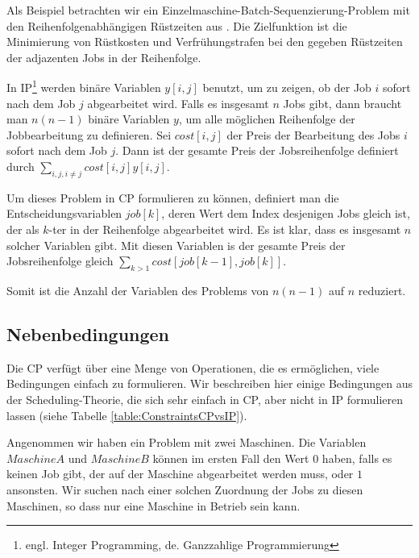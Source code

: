 Als Beispiel betrachten wir ein Einzelmaschine-Batch-Sequenzierung-Problem mit den Reihenfolgenabhängigen Rüstzeiten aus \cite{Jordan}. Die Zielfunktion ist die Minimierung von Rüstkosten und Verfrühungstrafen bei den gegeben Rüstzeiten der adjazenten Jobs in der Reihenfolge.

In IP\footnote{engl. Integer Programming, de. Ganzzahlige Programmierung} werden binäre Variablen $y[i,j]$ benutzt, um zu zeigen, ob der Job $i$ sofort nach dem Job $j$ abgearbeitet wird. Falls es insgesamt $n$ Jobs gibt, dann braucht man $n(n-1)$ binäre Variablen $y$, um alle möglichen Reihenfolge der Jobbearbeitung zu definieren. Sei $cost[i,j]$ der Preis der Bearbeitung des Jobs $i$ sofort nach dem Job $j$. Dann ist der gesamte Preis der Jobsreihenfolge definiert durch $\sum_{i,j,i\not =  j} {cost[i,j]y[i,j]}$.

Um dieses Problem in CP formulieren zu können, definiert man die Entscheidungsvariablen $job[k]$, deren Wert dem Index desjenigen Jobs gleich ist, der als $k$-ter in der Reihenfolge abgearbeitet wird. Es ist klar, dass es insgesamt $n$ solcher Variablen gibt. Mit diesen Variablen is der gesamte Preis der Jobsreihenfolge gleich $\sum_{k>1} {cost[job[k-1],job[k]]}$.

Somit ist die Anzahl der Variablen des Problems von $n(n-1)$ auf $n$ reduziert.

\subsection{Nebenbedingungen}

Die CP verfügt über eine Menge von Operationen, die es ermöglichen, viele Bedingungen einfach zu formulieren. Wir beschreiben hier einige Bedingungen aus der Scheduling-Theorie, die sich sehr einfach in CP, aber nicht in IP formulieren lassen (siehe Tabelle \ref{table:ConstraintsCPvsIP}).

Angenommen wir haben ein Problem mit zwei Maschinen. Die Variablen $MaschineA$ und $MaschineB$ können im ersten Fall den Wert $0$ haben, falls es keinen Job gibt, der auf der Maschine abgearbeitet werden muss, oder $1$ ansonsten. Wir suchen nach einer solchen Zuordnung der Jobs zu diesen Maschinen, so dass nur eine Maschine in Betrieb sein kann. 

